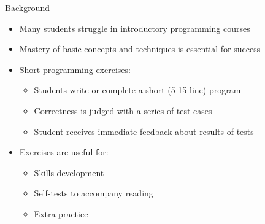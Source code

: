 \documentclass{beamer}
\begin{document}
\begin{frame}{Background}

\begin{itemize}
  \item Many students struggle in introductory programming courses
  \item Mastery of basic concepts and techniques is essential for success
  \item Short programming exercises:
  \begin{itemize}
    \item Students write or complete a short (5-15 line) program
    \item Correctness is judged with a series of test cases
    \item Student receives immediate feedback about results of tests
  \end{itemize}
  \item Exercises are useful for:
  \begin{itemize}
    \item Skills development
    \item Self-tests to accompany reading
    \item Extra practice
  \end{itemize}
\end{itemize}

\end{frame}
\end{document}
